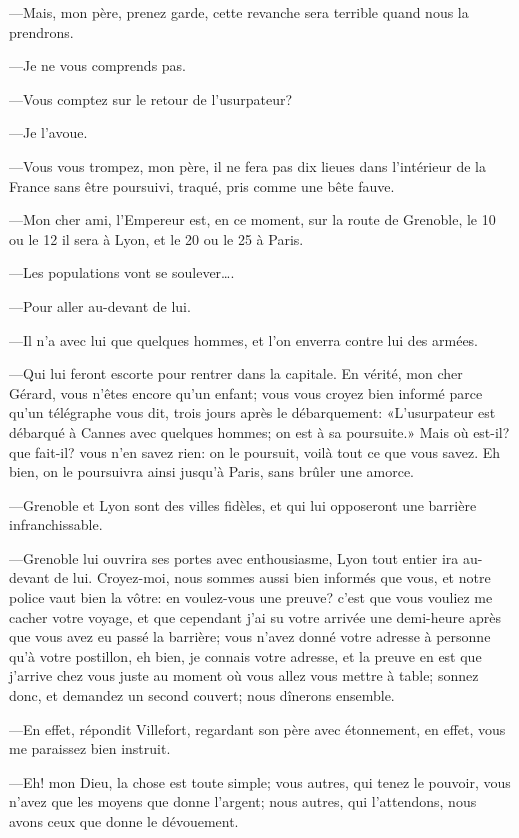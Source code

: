 —Mais, mon père, prenez garde, cette revanche sera terrible quand nous la prendrons.

—Je ne vous comprends pas.

—Vous comptez sur le retour de l'usurpateur?

—Je l'avoue.

—Vous vous trompez, mon père, il ne fera pas dix lieues dans l'intérieur de la France sans être poursuivi, traqué, pris comme une bête fauve.

—Mon cher ami, l'Empereur est, en ce moment, sur la route de Grenoble, le 10 ou le 12 il sera à Lyon, et le 20 ou le 25 à Paris.

—Les populations vont se soulever\dots.

—Pour aller au-devant de lui.

—Il n'a avec lui que quelques hommes, et l'on enverra contre lui des armées.

—Qui lui feront escorte pour rentrer dans la capitale. En vérité, mon cher Gérard, vous n'êtes encore qu'un enfant; vous vous croyez bien informé parce qu'un télégraphe vous dit, trois jours après le débarquement: «L'usurpateur est débarqué à Cannes avec quelques hommes; on est à sa poursuite.» Mais où est-il? que fait-il? vous n'en savez rien: on le poursuit, voilà tout ce que vous savez. Eh bien, on le poursuivra ainsi jusqu'à Paris, sans brûler une amorce.

—Grenoble et Lyon sont des villes fidèles, et qui lui opposeront une barrière infranchissable.

—Grenoble lui ouvrira ses portes avec enthousiasme, Lyon tout entier ira au-devant de lui. Croyez-moi, nous sommes aussi bien informés que vous, et notre police vaut bien la vôtre: en voulez-vous une preuve? c'est que vous vouliez me cacher votre voyage, et que cependant j'ai su votre arrivée une demi-heure après que vous avez eu passé la barrière; vous n'avez donné votre adresse à personne qu'à votre postillon, eh bien, je connais votre adresse, et la preuve en est que j'arrive chez vous juste au moment où vous allez vous mettre à table; sonnez donc, et demandez un second couvert; nous dînerons ensemble.

—En effet, répondit Villefort, regardant son père avec étonnement, en effet, vous me paraissez bien instruit.

—Eh! mon Dieu, la chose est toute simple; vous autres, qui tenez le pouvoir, vous n'avez que les moyens que donne l'argent; nous autres, qui l'attendons, nous avons ceux que donne le dévouement.

